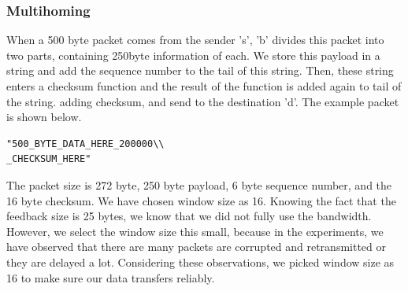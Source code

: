 \documentclass[12pt,journal,compsoc]{IEEEtran}
\begin{document}
\subsubsection{Multihoming}
When a 500 byte packet comes from the sender 's', 'b' divides this packet into two parts, containing 250byte information of each. We store this payload in a string and add the sequence number to the tail of this string. Then, these string enters a checksum function and the result of the function is added again to tail of the string. adding checksum, and send to the destination 'd'. The example packet is shown below.
\begin{verbatim}
"500_BYTE_DATA_HERE_200000\\
_CHECKSUM_HERE"
\end{verbatim}
The packet size is 272 byte, 250 byte payload, 6 byte sequence number, and the 16 byte checksum. We have chosen window size as 16. Knowing the fact that the feedback size is 25 bytes, we know that we did not fully use the bandwidth. However, we select the window size this small, because in the experiments, we have observed that there are many packets are corrupted and retransmitted or they are delayed a lot. Considering these observations, we picked window size as 16 to make sure our data transfers reliably.\\
\end{document}
